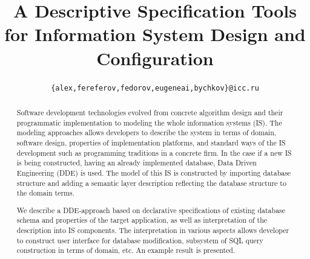\documentclass[conference]{IEEEtran}
\begin{document}
\title{A Descriptive Specification Tools for Information System Design and Configuration}
  \author{%
\texttt{\small \{alex,fereferov,fedorov,eugeneai,bychkov\}@icc.ru}
}


\maketitle

\def\thepage{Page \arabic{page}}

\begin{abstract}
Software development technologies evolved from concrete algorithm design and their programmatic implementation to modeling the whole information systems (IS).  The modeling approaches allows developers to describe the system in terms of domain, software design, properties of implementation platforms, and standard ways of the IS development such as programming traditions in a concrete firm.  In the case if a new IS is being constructed, having an already implemented database, Data Driven Engineering (DDE) is used.  The model of this IS is constructed by importing database structure and adding a semantic layer description reflecting the database structure to the domain terms.

We describe a DDE-approach based on declarative specifications of existing database schema and properties of the target application, as well as interpretation of the description into IS components.  The interpretation in various aspects allows developer to construct user interface for database modification, subsystem of SQL query construction in terms of domain, etc.  An example result is presented.

\end{abstract}
\end{document}
